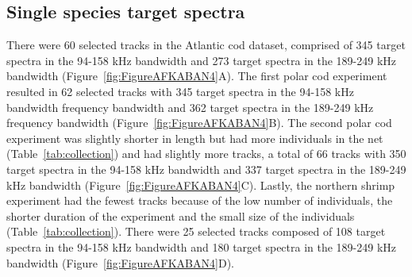 {\subsection{Single species target spectra}
There were 60 selected tracks in the Atlantic cod dataset, comprised of 345 target spectra in the 94-158 kHz bandwidth and 273 target spectra in the 189-249 kHz bandwidth (Figure~\ref{fig:FigureAFKABAN4}A). The first polar cod experiment resulted in 62 selected tracks with 345 target spectra in the 94-158 kHz bandwidth frequency bandwidth and 362 target spectra in the 189-249 kHz frequency bandwidth (Figure~\ref{fig:FigureAFKABAN4}B). The second polar cod experiment was slightly shorter in length but had more individuals in the net (Table~\ref{tab:collection}) and had slightly more tracks, a total of 66 tracks with 350 target spectra in the 94-158 kHz bandwidth and 337 target spectra in the 189-249 kHz bandwidth (Figure~\ref{fig:FigureAFKABAN4}C). Lastly, the northern shrimp experiment had the fewest tracks because of the low number of individuals, the shorter duration of the experiment and the small size of the individuals (Table~\ref{tab:collection}). There were 25 selected tracks composed of 108 target spectra in the 94-158 kHz bandwidth and 180 target spectra in the 189-249 kHz bandwidth (Figure~\ref{fig:FigureAFKABAN4}D). \\


}
